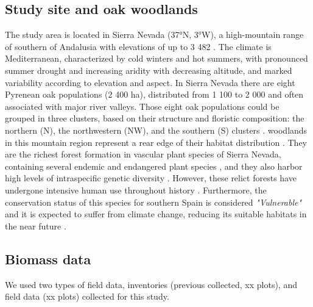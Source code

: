 \subsection{Study site and oak woodlands}\label{sec:carbon:mat-studysite}
The study area is located in Sierra Nevada (37°N, 3°W), a high-mountain range of southern of Andalusia with elevations of up to 3 482 \eleven. The climate is Mediterranean, characterized by cold winters and hot summers, with pronounced summer drought and increasing aridity with decreasing altitude, and marked variability according to elevation and aspect. In Sierra Nevada there are eight Pyrenean oak populations (2 400 ha), distributed from 1 100 to 2 000 \eleven and often associated with major river valleys. Those eight oak populations could be grouped in three clusters, based on their structure and floristic composition: the northern (N), the northwestern (NW), and the southern (S) clusters \autocite[see chapter \ref{sec:multivar}; also][]{PerezLuqueetal2021EcologicalDiversity}. \Qp woodlands in this mountain region represent a rear edge of their habitat distribution \autocite{HampePetit2005ConservingBiodiversity}. They are the richest forest formation in vascular plant species of Sierra Nevada, containing several endemic and endangered plant species \autocite{Loriteetal2008PhytosociologicalReview}, and they also harbor high levels of intraspecific genetic diversity \autocite{ValbuenaCarabanaGil2013GeneticResilience}. However, these relict forests have undergone intensive human use throughout history \autocite{CamachoOlmedoetal2002DinamicaEvolutiva}. Furthermore, the conservation status of this species for southern Spain is considered \emph{"Vulnerable"} and it is expected to suffer from climate change, reducing its suitable habitats in the near future \autocite{GeaIzquierdoetal2013GrowthProjections,GeaIzquierdoetal2017RiskyFuture,Benitoetal2011SimulatingPotential}.

\subsection{Biomass data}\label{sec:carbon:mat-field-data}


We used two types of field data, inventories (previous collected, xx plots), and field data (xx plots) collected for this study. 

